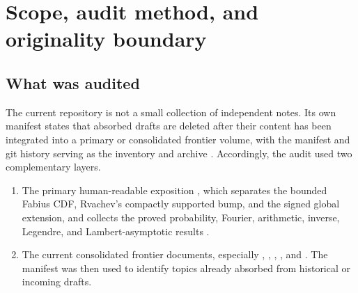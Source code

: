 \documentclass[11pt,oneside]{article}
\theoremstyle{definition}
\theoremstyle{remark}
\newcommand{\Ar}{\mathcal A}
\begin{document}
\begin{abstract}
A new probability interpretation is especially productive.  The normalized
ratio $\Ar_r(\theta z)/\Ar_r(\theta)$ is the probability generating function
of an infinite Poisson-binomial spectral count $N_{r,\theta}$.  It identifies
exact even moments with count probabilities, obeys a rank-branching law, and
has a multi-scale limit theory.  For $\theta_r=c a^r$, the count is degenerate
when $a<3$, converges in total variation to a fixed Poisson law at $a=3$, is
asymptotically Poisson with diverging mean for $3<a<\sqrt{15}$, has a
nontrivial mod-Poisson correction at $a=\sqrt{15}$, and is asymptotically
Gaussian throughout $3<a<5$.  Finally, $\Ar_r(w)^{-\tau}$ is the Laplace
transform of a generalized-gamma convolution with an explicit Thorin measure;
a separate rank central limit theorem and geometric standardized-cumulant
decay follow.

The report supplies complete proofs, exact Bell--Bernoulli formulas,
computational checks, a reproducible Python program, a conjecture register,
and a staged formalization plan.
\end{abstract}

\tableofcontents
\newpage

\section{Scope, audit method, and originality boundary}

\subsection{What was audited}

The current repository is not a small collection of independent notes.  Its
own manifest states that absorbed drafts are deleted after their content has
been integrated into a primary or consolidated frontier volume, with the
manifest and git history serving as the inventory and archive
\cite{repo-manifest}.  Accordingly, the audit used two complementary layers.

\begin{enumerate}
\item The primary human-readable exposition
, which separates the bounded Fabius
CDF, Rvachev's compactly supported bump, and the signed global extension, and
collects the proved probability, Fourier, arithmetic, inverse, Legendre, and
Lambert-asymptotic results \cite{repo-primary}.
\item The current consolidated frontier documents, especially
,
,
,
, and
 \cite{repo-frontier,repo-spectra,repo-q,repo-comb,repo-compilations}.
The manifest was then used to identify topics already absorbed from historical
or incoming drafts.
\end{enumerate}
\end{document}
